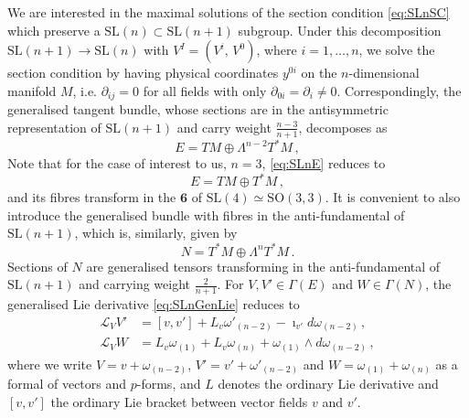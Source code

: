 \documentclass[a4paper, 11pt]{article}
\numberwithin{equation}{section}
\newcommand{\SL}[1]{\mathrm{SL}( #1 )}
\newcommand{\SO}[1]{\mathrm{SO}( #1 )}
\newcommand{\+}{\oplus}
\newcommand{\gL}{\mathcal{L}}
\begin{document}
We are interested in the maximal solutions of the section condition \eqref{eq:SLnSC} which preserve a $\SL{n} \subset \SL{n+1}$ subgroup. Under this decomposition $\SL{n+1} \rightarrow \SL{n}$ with $V^I = \left( V^i,\, V^0 \right)$, where $i = 1, \ldots, n$, we solve the section condition by having physical coordinates $y^{0i}$ on the $n$-dimensional manifold $M$, i.e. $\partial_{ij} = 0$ for all fields with only $\partial_{0i} = \partial_i \neq 0$. Correspondingly, the generalised tangent bundle, whose sections are in the antisymmetric representation of $\SL{n+1}$ and carry weight $\frac{n-3}{n+1}$, decomposes as
\begin{equation} \label{eq:SLnE}
	E = TM \oplus \Lambda^{n-2} T^*M \,,
\end{equation}
Note that for the case of interest to us, $n=3$, \eqref{eq:SLnE} reduces to
\begin{equation}
	E = TM \oplus T^*M \,,
\end{equation}
and its fibres transform in the $\mathbf{6}$ of $\SL{4} \simeq \SO{3,3}$. It is convenient to also introduce the generalised bundle with fibres in the anti-fundamental of $\SL{n+1}$, which is, similarly, given by
\begin{equation}
	N = T^*M \oplus \Lambda^{n} T^*M \,.
\end{equation}
Sections of $N$ are generalised tensors transforming in the anti-fundamental of $\SL{n+1}$ and carrying weight $\frac{2}{n+1}$. For $V, V' \in \Gamma(E)$ and $W \in \Gamma(N)$, the generalised Lie derivative \eqref{eq:SLnGenLie} reduces to
\begin{equation}
	\begin{split}
		\gL_{V} V' &= [v, v'] + L_{v} \omega'_{(n-2)} - \imath_{v'} d\omega_{(n-2)} \,, \\
		\gL_{V} W &= L_v \omega_{(1)} + L_v \omega_{(n)} + \omega_{(1)} \wedge d\omega_{(n-2)} \,,
	\end{split}
\end{equation}
where we write $V = v + \omega_{(n-2)}$, $V' = v' + \omega'_{(n-2)}$ and $W = \omega_{(1)} + \omega_{(n)}$ as a formal of vectors and $p$-forms, and $L$ denotes the ordinary Lie derivative and $[v,v']$ the ordinary Lie bracket between vector fields $v$ and $v'$.
\end{document}

